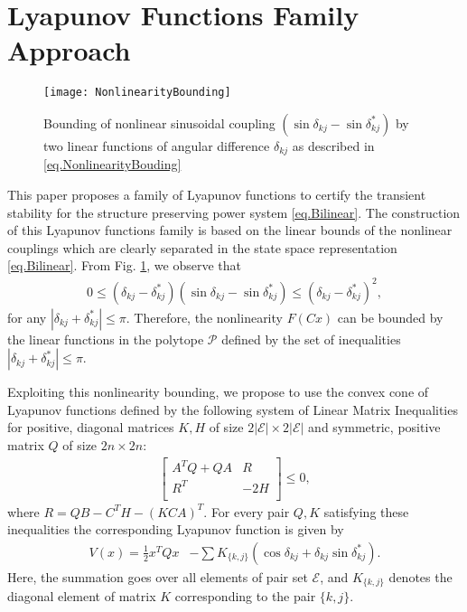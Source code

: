 \documentclass[final]{IEEEtran}
\begin{document}
\section{Lyapunov Functions Family Approach}
\label{sec:family}
\begin{figure}[t!]
\centering
\texttt{[image: NonlinearityBounding]}
\caption{Bounding of nonlinear sinusoidal coupling $(\sin\delta_{kj}-\sin\delta_{kj}^*)$ by two
linear functions of angular difference $\delta_{kj}$ as described in \eqref{eq.NonlinearityBouding}}
\label{fig.NonlinearityBounding}
\end{figure}
This paper proposes a family of Lyapunov functions to certify the
transient stability for the structure preserving power system \eqref{eq.Bilinear}. The
construction of this Lyapunov functions family is based on the
linear bounds of the nonlinear couplings which are clearly
separated in the state space representation \eqref{eq.Bilinear}.
From Fig. \ref{fig.NonlinearityBounding}, we observe that
\begin{align}
\label{eq.NonlinearityBouding}
  0\le
  (\delta_{kj}-\delta_{kj}^*)(\sin\delta_{kj}-\sin\delta_{kj}^*)
 \le (\delta_{kj}-\delta_{kj}^*)^2,
\end{align}
for any $| \delta_{kj}+\delta_{kj}^* |\le
\pi.$ Therefore, the nonlinearity $F(Cx)$ can be bounded by the linear functions in the polytope $\mathcal{P}$ defined by the
set of inequalities $|\delta_{kj} + \delta_{kj}^*| \le \pi$.


Exploiting this nonlinearity bounding, we propose to use the
convex cone of Lyapunov functions defined by the following system
of Linear Matrix Inequalities for positive, diagonal matrices
$K,H$ of size $2|\mathcal{E}| \times 2|\mathcal{E}|$ and
symmetric, positive matrix $Q$ of size $ 2n \times 2n:$
\begin{align}
\label{eq.QKH}
    \left[   \begin{array}{ccccc}
          A^TQ+QA  & R \\
           R^T  & -2H\\
        \end{array}\right] \le 0,
  \end{align}
where $R=QB-C^TH-(KCA)^T.$ For every pair $Q,K$ satisfying these
inequalities the corresponding Lyapunov function is given by
\begin{align}
\label{eq.Lyapunov}
V(x) = \frac{1}{2}x^T Q x &- \sum K_{\{k,j\}} (\cos\delta_{kj}+\delta_{kj}\sin\delta_{kj}^*).
\end{align}
Here, the summation goes over all elements of pair set
$\mathcal{E}$, and $K_{\{k,j\}}$ denotes the diagonal element of
matrix $K$ corresponding to the pair $\{k,j\}$.
\end{document}
